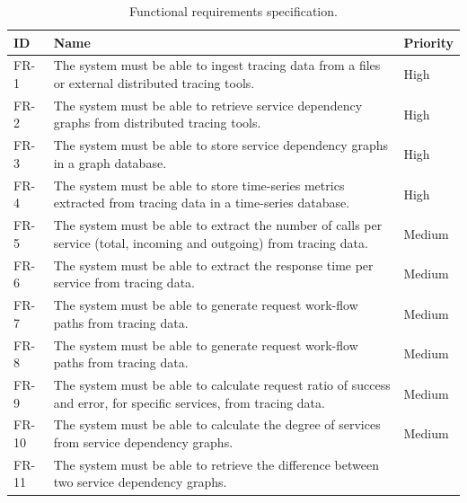 \begin{table}[H]
    \caption{Functional requirements specification.}
    \label{table:functional_requirements_specification}
    \centering
    \begin{tabularx}{\linewidth} {
            |>{\hsize=0.10\hsize}X|
            >{\hsize=0.75\hsize}X|
            >{\hsize=0.15\hsize}X|}
        \cline{1-3}
         \textbf{ID}
         & \textbf{Name}
         & \textbf{Priority}                                                                                                                                                                                  \\ \hline \hline
         FR-1
         & The system must be able to ingest tracing data from a files or external distributed tracing tools.
         & High \\ \hline
         FR-2
         & The system must be able to retrieve service dependency graphs from distributed tracing tools.
         & High \\ \hline
         FR-3
         & The system must be able to store service dependency graphs in a graph database.
         & High \\ \hline
         FR-4
         & The system must be able to store time-series metrics extracted from tracing data in a time-series database.
         & High \\ \hline
         FR-5
         & The system must be able to extract the number of calls per service (total, incoming and outgoing) from tracing data.
         & Medium \\ \hline
         FR-6
         & The system must be able to extract the response time per service from tracing data.
         & Medium \\ \hline
         FR-7
         & The system must be able to generate request work-flow paths from tracing data.
         & Medium \\ \hline
         FR-8
         & The system must be able to generate request work-flow paths from tracing data.
         & Medium \\ \hline
         FR-9
         & The system must be able to calculate request ratio of success and error, for specific services, from tracing data.
         & Medium \\ \hline
         FR-10
         & The system must be able to calculate the degree of services from service dependency graphs.
         & Medium \\ \hline
         FR-11
         & The system must be able to retrieve the difference between two service dependency graphs.

\end{tabularx}
\end{table}
